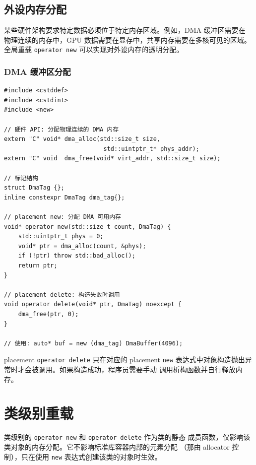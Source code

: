\documentclass[12pt,a4paper,fontset=fandol]{ctexbook}
\begin{document}
\section{外设内存分配}

某些硬件架构要求特定数据必须位于特定内存区域。例如，DMA 缓冲区需要在
物理连续的内存中，GPU 数据需要在显存中，共享内存需要在多核可见的区域。
全局重载 \texttt{operator new} 可以实现对外设内存的透明分配。

\subsection{DMA 缓冲区分配}

\begin{lstlisting}
#include <cstddef>
#include <cstdint>
#include <new>

// 硬件 API: 分配物理连续的 DMA 内存
extern "C" void* dma_alloc(std::size_t size,
                            std::uintptr_t* phys_addr);
extern "C" void  dma_free(void* virt_addr, std::size_t size);

// 标记结构
struct DmaTag {};
inline constexpr DmaTag dma_tag{};

// placement new: 分配 DMA 可用内存
void* operator new(std::size_t count, DmaTag) {
    std::uintptr_t phys = 0;
    void* ptr = dma_alloc(count, &phys);
    if (!ptr) throw std::bad_alloc();
    return ptr;
}

// placement delete: 构造失败时调用
void operator delete(void* ptr, DmaTag) noexcept {
    dma_free(ptr, 0);
}

// 使用: auto* buf = new (dma_tag) DmaBuffer(4096);
\end{lstlisting}

\begin{note}[title=Placement delete 的触发时机]
placement \texttt{operator delete} 只在对应的 placement \texttt{new}
表达式中对象构造抛出异常时才会被调用。如果构造成功，程序员需要手动
调用析构函数并自行释放内存。
\end{note}

\chapter{类级别重载}

类级别的 \texttt{operator new} 和 \texttt{operator delete} 作为类的静态
成员函数，仅影响该类对象的内存分配。它不影响标准库容器内部的元素分配
（那由 allocator 控制），只在使用 \texttt{new} 表达式创建该类的对象时生效。
\end{document}
